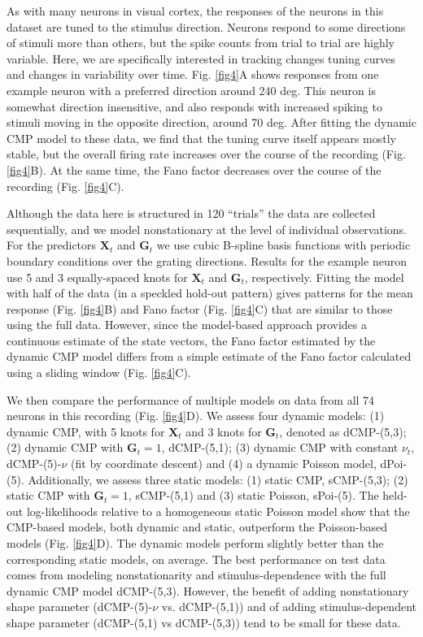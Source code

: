 \documentclass[aoas]{imsart}
\theoremstyle{plain}
\theoremstyle{remark}
\begin{document}
As with many neurons in visual cortex, the responses of the neurons in this dataset are tuned to the stimulus direction. Neurons respond to some directions of stimuli more than others, but the spike counts from trial to trial are highly variable. Here, we are specifically interested in tracking changes tuning curves and changes in variability over time. Fig. \ref{fig4}A shows responses from one example neuron with a preferred direction around 240 deg. This neuron is somewhat direction insensitive, and also responds with increased spiking to stimuli moving in the opposite direction, around 70 deg. After fitting the dynamic CMP model to these data, we find that the tuning curve itself appears mostly stable, but the overall firing rate increases over the course of the recording (Fig. \ref{fig4}B). At the same time, the Fano factor decreases over the course of the recording (Fig. \ref{fig4}C). 

Although the data here is structured in 120 “trials” the data are collected sequentially, and we model nonstationary at the level of individual observations. For the predictors $\bm{X}_t$ and $\bm{G}_t$ we use cubic B-spline basis functions with periodic boundary conditions over the grating directions. Results for the example neuron use 5 and 3 equally-spaced knots for $\bm{X}_t$ and $\bm{G}_t$, respectively. Fitting the model with half of the data (in a speckled hold-out pattern) gives patterns for the mean response (Fig. \ref{fig4}B) and Fano factor (Fig. \ref{fig4}C) that are similar to those using the full data. However, since the model-based approach provides a continuous estimate of the state vectors, the Fano factor estimated by the dynamic CMP model differs from a simple estimate of the Fano factor calculated using a sliding window (Fig. \ref{fig4}C).

We then compare the performance of multiple models on data from all 74 neurons in this recording (Fig. \ref{fig4}D). We assess four dynamic models: (1) dynamic CMP, with 5 knots for $\bm{X}_t$ and 3 knots for $\bm{G}_t$, denoted as dCMP-(5,3); (2) dynamic CMP with $\bm{G}_t=1$, dCMP-(5,1); (3) dynamic CMP with constant $\nu_t$, dCMP-(5)-$\nu$ (fit by coordinate descent) and (4) a dynamic Poisson model, dPoi-(5). Additionally, we assess three static models: (1) static CMP, sCMP-(5,3); (2) static CMP with $\bm{G}_t=1$, sCMP-(5,1) and (3) static Poisson, sPoi-(5). The held-out log-likelihoods relative to a homogeneous static Poisson model show that the CMP-based models, both dynamic and static, outperform the Poisson-based models (Fig. \ref{fig4}D). The dynamic models perform slightly better than the corresponding static models, on average. The best performance on test data comes from modeling nonstationarity and stimulus-dependence with the full dynamic CMP model dCMP-(5,3). However, the benefit of adding nonstationary shape parameter (dCMP-(5)-$\nu$ vs. dCMP-(5,1)) and of adding stimulus-dependent shape parameter (dCMP-(5,1) vs dCMP-(5,3)) tend to be small for these data.
\end{document}
